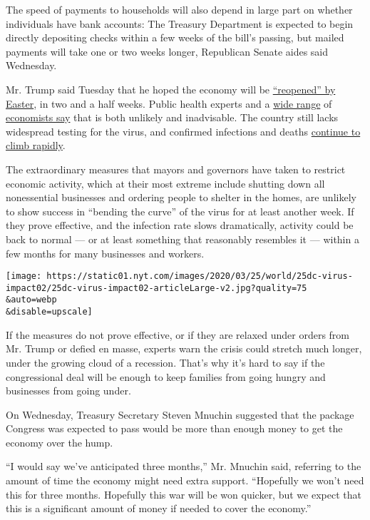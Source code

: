 The speed of payments to households will also depend in large part on
whether individuals have bank accounts: The Treasury Department is
expected to begin directly depositing checks within a few weeks of the
bill's passing, but mailed payments will take one or two weeks longer,
Republican Senate aides said Wednesday.

Mr. Trump said Tuesday that he hoped the economy will be
\href{https://www.nytimes.com/2020/03/24/us/politics/trump-coronavirus-easter.html}{``reopened''
by Easter}, in two and a half weeks. Public health experts and a
\href{https://economicstrategygroup.org/resource/economic-strategy-group-statement-covid19/}{wide
range} of
\href{http://www.columbia.edu/~wk2110/Corona/Statement.html}{economists
say} that is both unlikely and inadvisable. The country still lacks
widespread testing for the virus, and confirmed infections and deaths
\href{https://www.nytimes.com/interactive/2020/us/coronavirus-us-cases.html}{continue
to climb rapidly}.

The extraordinary measures that mayors and governors have taken to
restrict economic activity, which at their most extreme include shutting
down all nonessential businesses and ordering people to shelter in the
homes, are unlikely to show success in ``bending the curve'' of the
virus for at least another week. If they prove effective, and the
infection rate slows dramatically, activity could be back to normal ---
or at least something that reasonably resembles it --- within a few
months for many businesses and workers.

\texttt{[image: https://static01.nyt.com/images/2020/03/25/world/25dc-virus-impact02/25dc-virus-impact02-articleLarge-v2.jpg?quality=75\\\&auto=webp\\\&disable=upscale]}

If the measures do not prove effective, or if they are relaxed under
orders from Mr. Trump or defied en masse, experts warn the crisis could
stretch much longer, under the growing cloud of a recession. That's why
it's hard to say if the congressional deal will be enough to keep
families from going hungry and businesses from going under.

On Wednesday, Treasury Secretary Steven Mnuchin suggested that the
package Congress was expected to pass would be more than enough money to
get the economy over the hump.

``I would say we've anticipated three months,'' Mr. Mnuchin said,
referring to the amount of time the economy might need extra support.
``Hopefully we won't need this for three months. Hopefully this war will
be won quicker, but we expect that this is a significant amount of money
if needed to cover the economy.''

